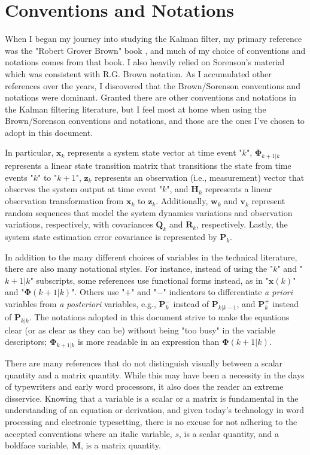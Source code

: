 \section{Conventions and Notations}
\label{Conventions and Notations}

When I began my journey into studying the Kalman filter, my primary reference was the
"Robert Grover Brown" book \cite{rgbrown1983}, and much of my choice of conventions and
notations comes from that book. I also heavily relied on Sorenson’s material
\cite{sorenson1985} which was consistent with R.G. Brown notation. As I accumulated other
references over the years, I discovered that the Brown/Sorenson conventions and notations
were dominant. Granted there are other conventions and notations in the Kalman filtering
literature, but I feel most at home when using the Brown/Sorenson conventions and notations,
and those are the ones I’ve chosen to adopt in this document.

In particular, $\mathbf{x}_k$ represents a system state vector at time event "$k$",
$\mathbf{\Phi}_{k+1|k}$ represents a linear state transition matrix that transitions the
state from time events "$k$" to "$k+1$",
$\mathbf{z}_k$ represents an observation (i.e., measurement) vector that observes the
system output at time event "$k$",
and $\mathbf{H}_k$ represents a linear observation transformation from $\mathbf{x}_k$
to $\mathbf{z}_k$.
Additionally, $\mathbf{w}_k$ and $\mathbf{v}_k$ represent random sequences that model the
system dynamics variations and observation variations, respectively, with covariances
$\mathbf{Q}_k$ and $\mathbf{R}_k$, respectively.
Lastly, the system state estimation error covariance is represented by $\mathbf{P}_k$.

In addition to the many different choices of variables in the technical literature, there
are also many notational styles.
For instance, instead of using the "$k$" and "$k+1|k$" subscripts, some references use
functional forms instead, as in "$\mathbf{x}(k)$" and "$\mathbf{\Phi}(k+1|k)$".
Others use "$+$" and "$-$" indicators to differentiate \textit{a priori} variables from
\textit{a posteriori} variables, e.g., $\mathbf{P}_k^-$ instead of $\mathbf{P}_{k|k-1}$,
and $\mathbf{P}_k^+$ instead of $\mathbf{P}_{k|k}$.
The notations adopted in this document strive to make the equations clear (or as clear
as they can be) without being "too busy" in the variable descriptors;
$\mathbf{\Phi}_{k+1|k}$ is more readable in an expression than $\mathbf{\Phi}(k+1|k)$.

There are many references that do not distinguish visually between a scalar quantity and
a matrix quantity. While this may have been a necessity in the days of typewriters and
early word processors, it also does the reader an extreme disservice. Knowing that a
variable is a scalar or a matrix is fundamental in the understanding of an equation or
derivation, and given today’s technology in word processing and electronic typesetting,
there is no excuse for not adhering to the accepted conventions where an italic variable,
$s$, is a scalar quantity, and a boldface variable, $\mathbf{M}$, is a matrix quantity.

